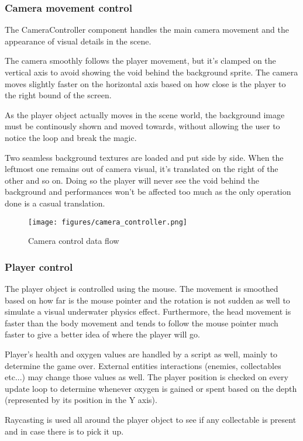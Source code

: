 \documentclass[11pt]{article}
\begin{document}
\subsubsection{Camera movement control}
The CameraController component handles the main camera movement and the appearance of visual details in the scene.

The camera smoothly follows the player movement, but it's clamped on the vertical axis to avoid showing the void behind the background sprite. The camera moves slightly faster on the horizontal axis based on how close is the player to the right bound of the screen.

As the player object actually moves in the scene world, the background image must be continously shown and moved towards, without allowing the user to notice the loop and break the magic.

Two seamless background textures are loaded and put side by side. When the leftmost one remains out of camera visual, it's translated on the right of the other and so on.
Doing so the player will never see the void behind the background and performances won't be affected too much as the only operation done is a casual translation.

\begin{figure}[H]
  \centering
  \texttt{[image: figures/camera\_controller.png]}
  \caption{Camera control data flow}
\end{figure}

\subsubsection{Player control}
The player object is controlled using the mouse. The movement is smoothed based on how far is the mouse pointer and the rotation is not sudden as well to simulate a visual underwater physics effect. Furthermore, the head movement is faster than the body movement and tends to follow the mouse pointer much faster to give a better idea of where the player will go.

Player's health and oxygen values are handled by a script as well, mainly to determine the game over. External entities interactions (enemies, collectables etc...) may change those values as well.
The player position is checked on every update loop to determine whenever oxygen is gained or spent based on the depth (represented by its position in the Y axis).

Raycasting is used all around the player object to see if any collectable is present and in case there is to pick it up.
\end{document}
